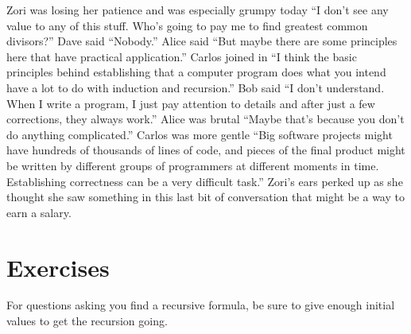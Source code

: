 Zori was losing her patience and was especially grumpy today ``I don't
see any value to any of this stuff.  Who's going to pay me to find
greatest common divisors?''  Dave said ``Nobody.''  Alice said ``But
maybe there are some principles here that have practical application.''
Carlos joined in ``I think the basic principles behind establishing
that a computer program does what you intend have a lot to do with
induction and recursion.''  Bob said ``I don't understand.  When
I write a program, I just pay attention to details and after just 
a few corrections, they always work.''  Alice was brutal ``Maybe that's
because you don't do anything complicated.''  Carlos was more gentle
``Big software projects might have hundreds of thousands of lines
of code, and pieces of the final product might be written by
different groups of programmers at different moments in time.
Establishing correctness can be a very difficult task.''
Zori's ears perked up as she thought she saw something in
this last bit of conversation that might be a way to earn a salary.

\section{Exercises}\label{s:induction:exercises}

For questions asking you find a recursive formula, be sure to give
enough initial values to get the recursion going.


